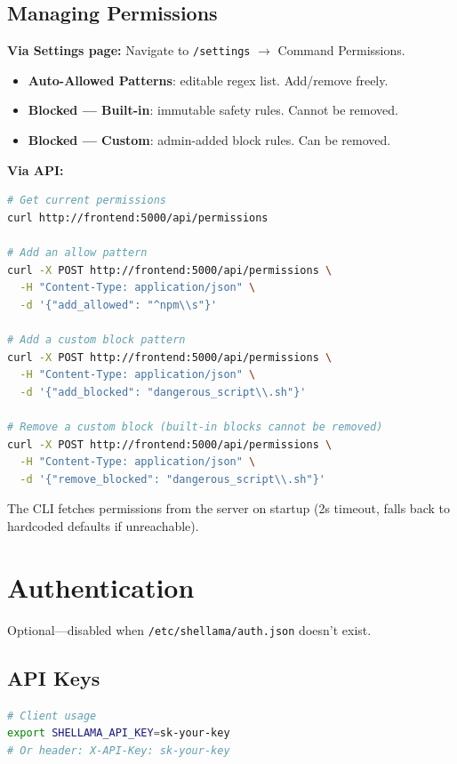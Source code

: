 \documentclass[11pt,a4paper]{article}
\begin{document}
\subsection{Managing Permissions}

\textbf{Via Settings page:} Navigate to \texttt{/settings} $\rightarrow$ Command Permissions.
\begin{itemize}
  \item \textbf{Auto-Allowed Patterns}: editable regex list. Add/remove freely.
  \item \textbf{Blocked --- Built-in}: immutable safety rules. Cannot be removed.
  \item \textbf{Blocked --- Custom}: admin-added block rules. Can be removed.
\end{itemize}

\textbf{Via API:}
\begin{lstlisting}[language=bash]
# Get current permissions
curl http://frontend:5000/api/permissions

# Add an allow pattern
curl -X POST http://frontend:5000/api/permissions \
  -H "Content-Type: application/json" \
  -d '{"add_allowed": "^npm\\s"}'

# Add a custom block pattern
curl -X POST http://frontend:5000/api/permissions \
  -H "Content-Type: application/json" \
  -d '{"add_blocked": "dangerous_script\\.sh"}'

# Remove a custom block (built-in blocks cannot be removed)
curl -X POST http://frontend:5000/api/permissions \
  -H "Content-Type: application/json" \
  -d '{"remove_blocked": "dangerous_script\\.sh"}'
\end{lstlisting}

The CLI fetches permissions from the server on startup (2s timeout, falls back to hardcoded defaults if unreachable).

\section{Authentication}

Optional---disabled when \texttt{/etc/shellama/auth.json} doesn't exist.

\subsection{API Keys}
\begin{lstlisting}[language=bash]
# Client usage
export SHELLAMA_API_KEY=sk-your-key
# Or header: X-API-Key: sk-your-key
\end{lstlisting}
\end{document}

